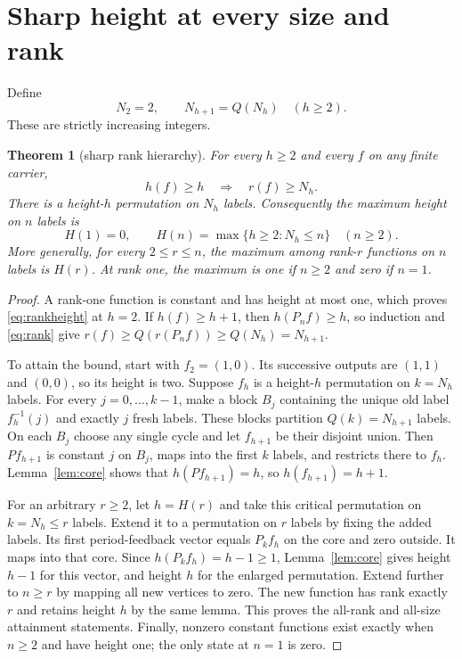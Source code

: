 \documentclass[a4paper,10pt]{amsart}
\newtheorem{theorem}{Theorem}[section]
\theoremstyle{remark}
\begin{document}
\section{Sharp height at every size and rank}
Define
\begin{equation}\label{eq:threshold}
 N_2=2,\qquad N_{h+1}=Q(N_h)\quad(h\ge2).
\end{equation}
These are strictly increasing integers.
\begin{theorem}[sharp rank hierarchy]\label{thm:height}
For every $h\ge2$ and every $f$ on any finite carrier,
\begin{equation}\label{eq:rankheight}
 h(f)\ge h\quad\Longrightarrow\quad r(f)\ge N_h.
\end{equation}
There is a height-$h$ permutation on $N_h$ labels. Consequently the
maximum height on $n$ labels is
\begin{equation}\label{eq:maxheight}
 H(1)=0,\qquad H(n)=\max\{h\ge2:N_h\le n\}\quad(n\ge2).
\end{equation}
More generally, for every $2\le r\le n$, the maximum among rank-$r$
functions on $n$ labels is $H(r)$. At rank one, the maximum is one if
$n\ge2$ and zero if $n=1$.
\end{theorem}
\begin{proof}
A rank-one function is constant and has height at most one, which proves
\eqref{eq:rankheight} at $h=2$. If $h(f)\ge h+1$, then
$h(P_nf)\ge h$, so induction and \eqref{eq:rank} give
$r(f)\ge Q(r(P_nf))\ge Q(N_h)=N_{h+1}$.

To attain the bound, start with $f_2=(1,0)$. Its successive outputs are
$(1,1)$ and $(0,0)$, so its height is two. Suppose $f_h$ is a height-$h$
permutation on $k=N_h$ labels. For every $j=0,\ldots,k-1$, make a block
$B_j$ containing the unique old label $f_h^{-1}(j)$ and exactly $j$
fresh labels. These blocks partition $Q(k)=N_{h+1}$ labels. On each
$B_j$ choose any single cycle and let $f_{h+1}$ be their disjoint union.
Then $P f_{h+1}$ is constant $j$ on $B_j$, maps into the first $k$
labels, and restricts there to $f_h$. Lemma~\ref{lem:core} shows that
$h(P f_{h+1})=h$, so $h(f_{h+1})=h+1$.

For an arbitrary $r\ge2$, let $h=H(r)$ and take this critical
permutation on $k=N_h\le r$ labels. Extend it to a permutation on $r$
labels by fixing the added labels. Its first period-feedback vector
equals $P_k f_h$ on the core and zero outside. It maps into that core.
Since $h(P_k f_h)=h-1\ge1$, Lemma~\ref{lem:core} gives height $h-1$
for this vector, and height $h$ for the enlarged permutation. Extend
further to $n\ge r$ by mapping all new vertices to zero. The new function
has rank exactly $r$ and retains height $h$ by the same lemma.
This proves the all-rank and all-size attainment statements. Finally,
nonzero constant functions exist exactly when $n\ge2$ and have height
one; the only state at $n=1$ is zero.
\end{proof}
\end{document}

